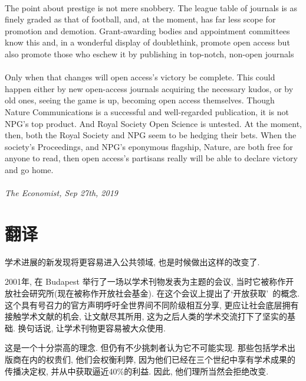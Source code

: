 \documentclass[a4paper, 12pt, UTF8]{article}
\begin{document}
\paragraph*{}
    The point about prestige is not mere snobbery. The league table of journals is as finely graded as that of football, and, at the moment, has far less scope for promotion and demotion. Grant-awarding bodies and appointment committees know this and, in a wonderful display of doublethink, promote open access but also promote those who eschew it by publishing in top-notch, non-open journals

\paragraph*{}
    Only when that changes will open access’s victory be complete. This could happen either by new open-access journals acquiring the necessary kudos, or by old ones, seeing the game is up, becoming open access themselves. Though Nature Communications is a successful and well-regarded publication, it is not NPG’s top product. And Royal Society Open Science is untested. At the moment, then, both the Royal Society and NPG seem to be hedging their bets. When the society’s Proceedings, and NPG’s eponymous flagship, Nature, are both free for anyone to read, then open access’s partisans really will be able to declare victory and go home.

\paragraph*{}
    \emph{\small The Economist, Sep 27th, 2019}

\section{翻译}
学术进展的新发现将更容易进入公共领域, 也是时候做出这样的改变了.

2001年, 在 Budapest 举行了一场以学术刊物发表为主题的会议, 当时它被称作开放社会研究所(现在被称作开放社会基金). 在这个会议上提出了\lq 开放获取\rq\ 的概念. 这个具有号召力的官方声明呼吁全世界间不同阶级相互分享, 更应让社会底层拥有接触学术文献的机会, 让文献尽其所用, 这为之后人类的学术交流打下了坚实的基础. 换句话说, 让学术刊物更容易被大众使用.

这是一个十分崇高的理念. 但仍有不少挑刺者认为它不可能实现. 那些包括学术出版商在内的权贵们, 他们会权衡利弊, 因为他们已经在三个世纪中享有学术成果的传播决定权, 并从中获取逼近40\%的利益. 因此, 他们理所当然会拒绝改变.
\end{document}
